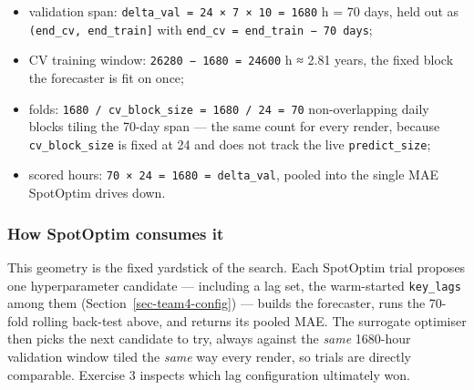 \documentclass[
  english,
  letterpaper,
]{scrbook}
\providecommand{\tightlist}{%
  \setlength{\itemsep}{0pt}\setlength{\parskip}{0pt}}
\begin{document}
\begin{itemize}
\tightlist
\item
  validation span: \texttt{delta\_val\ =\ 24\ ×\ 7\ ×\ 10\ =\ 1680} h =
  70 days, held out as \texttt{(end\_cv,\ end\_train{]}} with
  \texttt{end\_cv\ =\ end\_train\ −\ 70\ days};
\item
  CV training window: \texttt{26280\ −\ 1680\ =\ 24600} h ≈ 2.81 years,
  the fixed block the forecaster is fit on once;
\item
  folds: \texttt{1680\ /\ cv\_block\_size\ =\ 1680\ /\ 24\ =\ 70}
  non-overlapping daily blocks tiling the 70-day span --- the same count
  for every render, because \texttt{cv\_block\_size} is fixed at 24 and
  does not track the live \texttt{predict\_size};
\item
  scored hours: \texttt{70\ ×\ 24\ =\ 1680\ =\ delta\_val}, pooled into
  the single MAE SpotOptim drives down.
\end{itemize}

\subsubsection{How SpotOptim consumes
it}\label{how-spotoptim-consumes-it}

This geometry is the fixed yardstick of the search. Each SpotOptim trial
proposes one hyperparameter candidate --- including a lag set, the
warm-started \texttt{key\_lags} among them
(Section~\ref{sec-team4-config}) --- builds the forecaster, runs the
70-fold rolling back-test above, and returns its pooled MAE. The
surrogate optimiser then picks the next candidate to try, always against
the \emph{same} 1680-hour validation window tiled the \emph{same} way
every render, so trials are directly comparable. Exercise 3 inspects
which lag configuration ultimately won.
\end{document}
